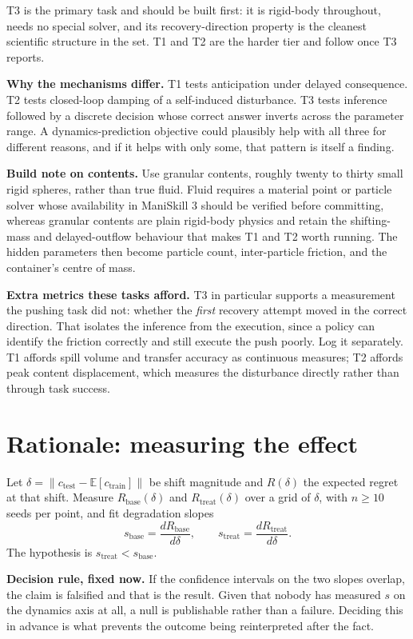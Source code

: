 \documentclass[9pt]{extarticle}
\begin{document}
T3 is the primary task and should be built first: it is rigid-body throughout, needs no special solver, and its recovery-direction property is the cleanest scientific structure in the set. T1 and T2 are the harder tier and follow once T3 reports.

\textbf{Why the mechanisms differ.} T1 tests anticipation under delayed consequence. T2 tests closed-loop damping of a self-induced disturbance. T3 tests inference followed by a discrete decision whose correct answer inverts across the parameter range. A dynamics-prediction objective could plausibly help with all three for different reasons, and if it helps with only some, that pattern is itself a finding.

\textbf{Build note on contents.} Use granular contents, roughly twenty to thirty small rigid spheres, rather than true fluid. Fluid requires a material point or particle solver whose availability in ManiSkill 3 should be verified before committing, whereas granular contents are plain rigid-body physics and retain the shifting-mass and delayed-outflow behaviour that makes T1 and T2 worth running. The hidden parameters then become particle count, inter-particle friction, and the container's centre of mass.

\textbf{Extra metrics these tasks afford.} T3 in particular supports a measurement the pushing task did not: whether the \emph{first} recovery attempt moved in the correct direction. That isolates the inference from the execution, since a policy can identify the friction correctly and still execute the push poorly. Log it separately. T1 affords spill volume and transfer accuracy as continuous measures; T2 affords peak content displacement, which measures the disturbance directly rather than through task success.

\section{Rationale: measuring the effect}

Let $\delta = \|c_{\text{test}} - \mathbb{E}[c_{\text{train}}]\|$ be shift magnitude and $R(\delta)$ the expected regret at that shift. Measure $R_{\text{base}}(\delta)$ and $R_{\text{treat}}(\delta)$ over a grid of $\delta$, with $n \geq 10$ seeds per point, and fit degradation slopes
\[
s_{\text{base}} = \frac{dR_{\text{base}}}{d\delta}, \qquad s_{\text{treat}} = \frac{dR_{\text{treat}}}{d\delta}.
\]
The hypothesis is $s_{\text{treat}} < s_{\text{base}}$.

\textbf{Decision rule, fixed now.} If the confidence intervals on the two slopes overlap, the claim is falsified and that is the result. Given that nobody has measured $s$ on the dynamics axis at all, a null is publishable rather than a failure. Deciding this in advance is what prevents the outcome being reinterpreted after the fact.
\end{document}
